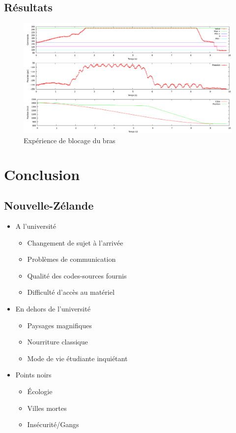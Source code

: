 \documentclass{beamer}
\begin{document}
\subsection{Résultats}
\begin{frame}
\begin{figure}
\includegraphics[width=1.05\linewidth]{images/stop}
\caption{Expérience de blocage du bras}
\end{figure}
\end{frame}

\section{Conclusion}
\subsection{Nouvelle-Zélande}
\begin{frame}
\begin{itemize}
\item A l'université
\begin{itemize}
\item Changement de sujet à l'arrivée
\item Problèmes de communication
\item Qualité des codes-sources fournis
\item Difficulté d'accès au matériel
\end{itemize}
\vspace{3mm}
\item En dehors de l'université
\begin{itemize}
\item Paysages magnifiques
\item Nourriture classique
\item Mode de vie étudiante inquiétant
\end{itemize}
\end{itemize}
\vspace{3mm}
\begin{itemize}
\item Points noirs
\begin{itemize}
\item \'Ecologie
\item Villes mortes
\item Insécurité/Gangs
\end{itemize}
\end{itemize}
\end{frame}
\end{document}
